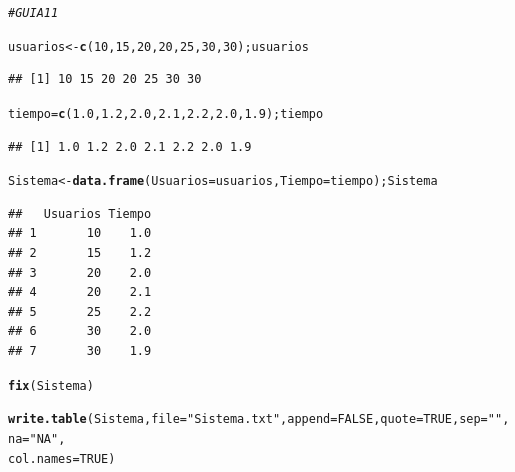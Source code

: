 \documentclass{article}\usepackage[]{graphicx}\usepackage[]{color}
\makeatletter
\newcommand{\hlnum}[1]{\textcolor[rgb]{0.686,0.059,0.569}{#1}}%
\newcommand{\hlstr}[1]{\textcolor[rgb]{0.192,0.494,0.8}{#1}}%
\newcommand{\hlcom}[1]{\textcolor[rgb]{0.678,0.584,0.686}{\textit{#1}}}%
\newcommand{\hlstd}[1]{\textcolor[rgb]{0.345,0.345,0.345}{#1}}%
\newcommand{\hlkwb}[1]{\textcolor[rgb]{0.69,0.353,0.396}{#1}}%
\newcommand{\hlkwc}[1]{\textcolor[rgb]{0.333,0.667,0.333}{#1}}%
\newcommand{\hlkwd}[1]{\textcolor[rgb]{0.737,0.353,0.396}{\textbf{#1}}}%
\newenvironment{kframe}{%
 \def\at@end@of@kframe{}%
 \ifinner\ifhmode%
  \def\at@end@of@kframe{\end{minipage}}%
  \begin{minipage}{\columnwidth}%
 \fi\fi%
 \def\FrameCommand##1{\hskip\@totalleftmargin \hskip-\fboxsep
 \colorbox{shadecolor}{##1}\hskip-\fboxsep
     \hskip-\linewidth \hskip-\@totalleftmargin \hskip\columnwidth}%
 \MakeFramed {\advance\hsize-\width
   \@totalleftmargin\z@ \linewidth\hsize
   \@setminipage}}%
 {\par\unskip\endMakeFramed%
 \at@end@of@kframe}
\newenvironment{knitrout}{}{} %
\makeatother
\begin{document}
\begin{knitrout}
\color{fgcolor}\begin{kframe}
\begin{alltt}
\hlcom{#GUIA 11}

\hlstd{usuarios} \hlkwb{<-} \hlkwd{c}\hlstd{(}\hlnum{10}\hlstd{,} \hlnum{15}\hlstd{,} \hlnum{20}\hlstd{,} \hlnum{20}\hlstd{,} \hlnum{25}\hlstd{,} \hlnum{30}\hlstd{,} \hlnum{30}\hlstd{); usuarios}
\end{alltt}
\begin{verbatim}
## [1] 10 15 20 20 25 30 30
\end{verbatim}
\begin{alltt}
\hlstd{tiempo} \hlkwb{=} \hlkwd{c}\hlstd{(}\hlnum{1.0}\hlstd{,} \hlnum{1.2}\hlstd{,} \hlnum{2.0}\hlstd{,} \hlnum{2.1}\hlstd{,} \hlnum{2.2}\hlstd{,} \hlnum{2.0}\hlstd{,} \hlnum{1.9}\hlstd{); tiempo}
\end{alltt}
\begin{verbatim}
## [1] 1.0 1.2 2.0 2.1 2.2 2.0 1.9
\end{verbatim}
\begin{alltt}
\hlstd{Sistema} \hlkwb{<-} \hlkwd{data.frame}\hlstd{(}\hlkwc{Usuarios}\hlstd{=usuarios,} \hlkwc{Tiempo}\hlstd{=tiempo);Sistema}
\end{alltt}
\begin{verbatim}
##   Usuarios Tiempo
## 1       10    1.0
## 2       15    1.2
## 3       20    2.0
## 4       20    2.1
## 5       25    2.2
## 6       30    2.0
## 7       30    1.9
\end{verbatim}
\begin{alltt}
\hlkwd{fix}\hlstd{(Sistema)}

\hlkwd{write.table}\hlstd{(Sistema,} \hlkwc{file}\hlstd{=}\hlstr{"Sistema.txt"}\hlstd{,} \hlkwc{append}\hlstd{=}\hlnum{FALSE}\hlstd{,} \hlkwc{quote}\hlstd{=}\hlnum{TRUE}\hlstd{,} \hlkwc{sep}\hlstd{=}\hlstr{" "}\hlstd{,} \hlkwc{na}\hlstd{=}\hlstr{"NA"}\hlstd{,}
\hlkwc{col.names} \hlstd{=} \hlnum{TRUE}\hlstd{)}


\end{alltt}
\end{kframe}
\end{knitrout}
\end{document}

